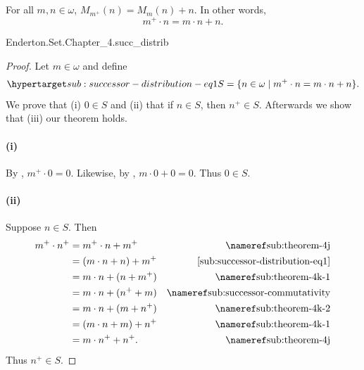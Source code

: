 \documentclass{report}
\begin{document}
\subsection{}%

  \begin{lemma}
    For all $m, n \in \omega$, $M_{m^+}(n) = M_m(n) + n$.
    In other words, $$m^+ \cdot n = m \cdot n + n.$$
  \end{lemma}

    {Enderton.Set.Chapter\_4.succ\_distrib}


  \begin{proof}

    Let $m \in \omega$ and define
      \begin{equation}
        \hyperlabel{sub:successor-distribution-eq1}
        S = \{n \in \omega \mid m^+ \cdot n = m \cdot n + n\}.
      \end{equation}
    We prove that (i) $0 \in S$ and (ii) that if $n \in S$, then $n^+ \in S$.
    Afterwards we show that (iii) our theorem holds.

    \paragraph{(i)}%

      By , $m^+ \cdot 0 = 0$.
      Likewise, by , $m \cdot 0 + 0 = 0$.
      Thus $0 \in S$.

    \paragraph{(ii)}%

      Suppose $n \in S$.
      Then
        \begin{align*}
          m^+ \cdot n^+
            & = m^+ \cdot n + m^+ & \textref{sub:theorem-4j} \\
            & = (m \cdot n + n) + m^+ & \eqref{sub:successor-distribution-eq1} \\
            & = m \cdot n + (n + m^+) & \textref{sub:theorem-4k-1} \\
            & = m \cdot n + (n^+ + m) & \textref{sub:successor-commutativity} \\
            & = m \cdot n + (m + n^+) & \textref{sub:theorem-4k-2} \\
            & = (m \cdot n + m) + n^+ & \textref{sub:theorem-4k-1} \\
            & = m \cdot n^+ + n^+. & \textref{sub:theorem-4j}
        \end{align*}
      Thus $n^+ \in S$.


\end{proof}
\end{document}
